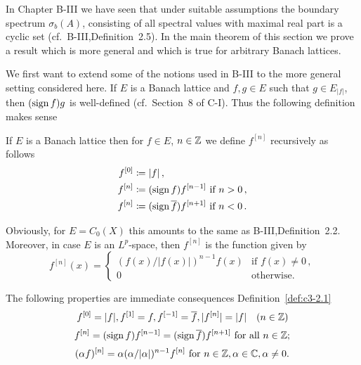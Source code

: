 In Chapter B-III we have seen that under suitable assumptions the boundary spectrum $\sigma_{b}(A)$, consisting of all spectral values with maximal real part is a cyclic set (cf.\ B-III,Definition~2.5).
In the main theorem of this section we prove a result which is more general and which is true for arbitrary Banach lattices.

We first want to extend some of the notions used in B-III to the more general setting considered here.
If $E$ is a Banach lattice and $f,g \in E$ such that $g \in E_{|f|}$, then $(\operatorname{sign}  f)g$ is well-defined (cf.\ Section~8 of C-I).
Thus the following definition makes sense
\begin{definition}\label{def:c3-2.1}
	If $E$ is a Banach lattice then for $f \in E$, $n \in \mathbb{Z}$ we define $f^{[n]}$ recursively as follows
	\begin{equation}\label{eq:c3-2.1}
	\begin{aligned}
		f^{[0]} &\coloneqq |f|\,, \\
		f^{[n]} &\coloneqq (\operatorname{sign}  f)f^{[n-1]} \text{ if } n > 0\,,\\
		f^{[n]} &\coloneqq (\operatorname{sign}  \overline{f})f^{[n+1]} \text{ if } n < 0\,.
	\end{aligned}
	\end{equation}
\end{definition}

Obviously, for $E = C_{0}(X)$ this amounts to the same as B-III,Definition~2.2.
Moreover, in case $E$ is an $L^p$-space, then $f^{[n]}$ is the function given by
\begin{equation}\label{eq:c3-2.2}
	f^{[n]}(x) = \begin{cases}
		(f(x)/|f(x)|)^{n-1}f(x) & \text{if } f(x) \neq 0\,, \\
		0 & \text{otherwise}.
	\end{cases}
\end{equation}

The following properties are immediate consequences Definition~\ref{def:c3-2.1}
\begin{equation}\label{eq:c3-2.3}
	f^{[0]} = |f|, f^{[1]} = f, f^{[-1]} = \overline{f}, |f^{[n]}| = |f| \quad (n \in \mathbb{Z})
\end{equation}
\begin{equation}\label{eq:c3-2.4}
	f^{[n]} = (\operatorname{sign}  f)f^{[n-1]} = (\operatorname{sign}  \overline{f})f^{[n+1]} \text{ for all } n \in \mathbb{Z};
\end{equation}
\begin{equation}\label{eq:c3-2.5}
	(\alpha f)^{[n]} = \alpha(\alpha/|\alpha|)^{n-1}f^{[n]} \text{ for } n \in \mathbb{Z}, \alpha \in \mathbb{C} , \alpha \neq 0.
\end{equation}

